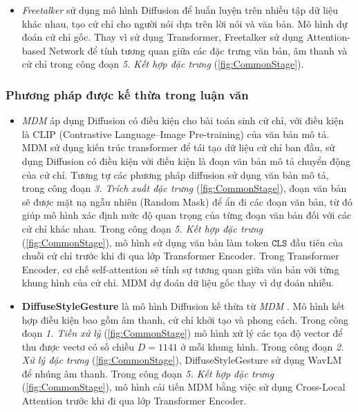 \begin{itemize}
	\item \textit{Freetalker} \cite{yang2024freetalker} sử dụng mô hình Diffusion để huấn luyện trên nhiều tập dữ liệu khác nhau, tạo cử chỉ cho người nói dựa trên lời nói và văn bản. Mô hình dự đoán cử chỉ gốc. Thay vì sử dụng Transformer, Freetalker sử dụng Attention-based Network để tính tương quan giữa các đặc trưng văn bản, âm thanh và cử chỉ trong công đoạn \textit{5. Kết hợp đặc trưng} (\autoref{fig:CommonStage}).
\end{itemize}


\subsubsection{Phương pháp được kế thừa trong luận văn}

\begin{itemize}
	\item \textit{MDM} \cite{tevet2022human}  áp dụng Diffusion có điều kiện cho bài toán sinh cử chỉ, với điều kiện là CLIP (Contrastive Language–Image Pre-training) của văn bản mô tả. MDM sử dụng kiến trúc transformer để tái tạo dữ liệu cử chỉ ban đầu, sử dụng Diffusion có điều kiện với điều kiện là đoạn văn bản mô tả chuyển động của cử chỉ. Tương tự các phương pháp diffusion sử dụng văn bản mô tả, trong công đoạn \textit{3. Trích xuất đặc trưng} (\autoref{fig:CommonStage}), đoạn văn bản sẽ được mặt nạ ngẫu nhiên (Random Mask) để ẩn đi các đoạn văn bản, từ đó giúp mô hình xác định mức độ quan trọng của từng đoạn văn bản đối với các cử chỉ khác nhau.
	Trong công đoạn \textit{5. Kết hợp đặc trưng} (\autoref{fig:CommonStage}), mô hình sử dụng văn bản làm token $\texttt{CLS}$ đầu tiên của chuỗi cử chỉ trước khi đi qua lớp Transformer Encoder. Trong Transformer Encoder, cơ chế self-attention sẽ tính sự tương quan giữa văn bản với từng khung hình của cử chỉ. MDM dự đoán dữ liệu gốc thay vì dự đoán nhiễu.
	
	\item \textbf{DiffuseStyleGesture} \cite{yang2023diffusestylegesture} là mô hình Diffusion kế thừa từ \textit{MDM} \cite{tevet2022human}. Mô hình kết hợp điều kiện bao gồm âm thanh, cử chỉ khởi tạo và phong cách. Trong công đoạn \textit{1. Tiền xử lý} (\autoref{fig:CommonStage}) mô hình xử lý các tọa độ vector để thu được vectơ có số chiều $D=1141$ ở mỗi khung hình. Trong công đoạn \textit{2. Xử lý đặc trưng} (\autoref{fig:CommonStage}), DiffuseStyleGesture sử dụng WavLM để nhúng âm thanh. Trong công đoạn \textit{5. Kết hợp đặc trưng} (\autoref{fig:CommonStage}), mô hình cải tiến MDM bằng việc sử dụng Cross-Local Attention trước khi đi qua lớp Transformer Encoder.
\end{itemize}

